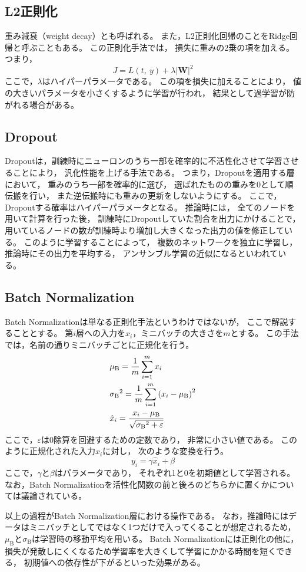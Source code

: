\documentclass[class=jsarticle, crop=false, dvipdfmx, fleqn]{standalone}
\begin{document}
\subsection{L2正則化}

重み減衰（weight decay）とも呼ばれる。
また，L2正則化回帰のことをRidge回帰と呼ぶこともある。
この正則化手法では，
損失に重みの2乗の項を加える。
つまり，
\begin{equation}
J = L(t,\ y) + \lambda |\bm{W}|^2
\end{equation}
ここで，$\lambda$はハイパーパラメータである。
この項を損失に加えることにより，
値の大きいパラメータを小さくするように学習が行われ，
結果として過学習が防がれる場合がある。


\subsection{Dropout}

Dropoutは，訓練時にニューロンのうち一部を確率的に不活性化させて学習させることにより，
汎化性能を上げる手法である。
つまり，Dropoutを適用する層において，
重みのうち一部を確率的に選び，
選ばれたものの重みを0として順伝搬を行い，
また逆伝搬時にも重みの更新をしないようにする。
ここで，Dropoutする確率はハイパーパラメータとなる。
推論時には，
全てのノードを用いて計算を行った後，
訓練時にDropoutしていた割合を出力にかけることで，
用いているノードの数が訓練時より増加し大きくなった出力の値を修正している。
このように学習することによって，
複数のネットワークを独立に学習し，
推論時にその出力を平均する，
アンサンブル学習の近似になるといわれている。



\subsection{Batch Normalization}

Batch Normalizationは単なる正則化手法というわけではないが，
ここで解説することとする。
第$i$層への入力を$x_i$，ミニバッチの大きさを$m$とする。
この手法では，名前の通りミニバッチごとに正規化を行う。
\begin{align}
& \mu_\mathrm{B} = \frac{1}{m} \sum_{i=1}^{m} x_i \\
& {\sigma_\mathrm{B}}^2 = \frac{1}{m} \sum_{i=1}^m \qty(x_i - \mu_\mathrm{B})^2 \\
& \hat{x}_i = \frac{x_i - \mu_\mathrm{B}}{\sqrt{{\sigma_\mathrm{B}}^2 + \varepsilon}}
\end{align}
ここで，$\varepsilon$は0除算を回避するための定数であり，
非常に小さい値である。
このように正規化された入力$\hat{x}_i$に対し，
次のような変換を行う。
\begin{equation}
y_i = \gamma \hat{x}_i + \beta
\end{equation}
ここで，$\gamma$と$\beta$はパラメータであり，
それぞれ1と0を初期値として学習される。
なお，Batch Normalizationを活性化関数の前と後ろのどちらかに置くかについては議論されている。

以上の過程がBatch Normalization層における操作である。
なお，推論時にはデータはミニバッチとしてではなく1つだけで入ってくることが想定されるため，
$\mu_\mathrm{B}$と$\sigma_\mathrm{B}$は学習時の移動平均を用いる。
Batch Normalizationには正則化の他に，
損失が発散しにくくなるため学習率を大きくして学習にかかる時間を短くできる，
初期値への依存性が下がるといった効果がある。
\end{document}
